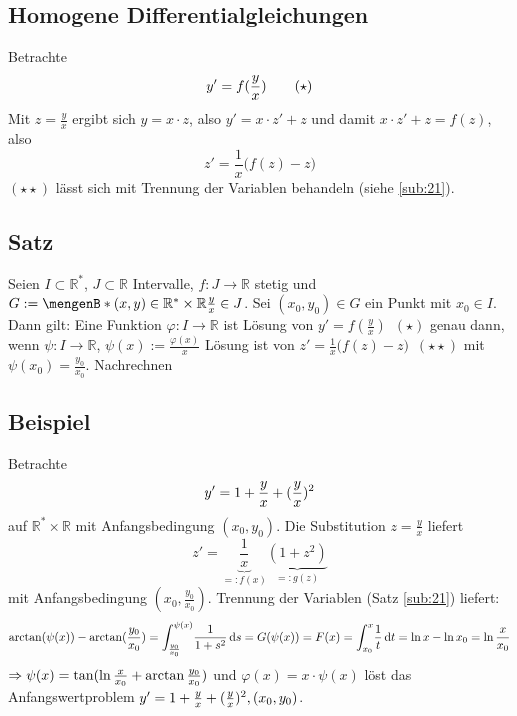 \subsection{Homogene Differentialgleichungen} %
\label{sub:27}
Betrachte
\[
	y' = f (\frac{y}{x} ) \tag{$\star$}
\]
Mit $z= \frac{y}{x} $ ergibt sich $y= x \cdot z$, also $y' = x \cdot z' + z$ und damit $x \cdot z' +z = f(z)$, also
\[
	z'=  \frac{1}{x} \big(f(z)-z\big) \tag{$\star\star$}
\]
$(\star\star)$ lässt sich mit Trennung der Variablen behandeln (siehe \ref{sub:21}). 

\subsection[Satz: Lösung von homogenen Differentialgleichungen]{Satz} %
\label{sub:27.2}
Seien $I \subset \mathds{R}^*$, $J \subset \mathds{R}$ Intervalle, $f : J \to \mathds{R}$ stetig und 
$G := \set[(x,y) \in \mathds{R}^* \times \mathds{R}]{\frac{y}{x} \in J } $. Sei $(x_0,y_0) \in G$ ein Punkt mit $x_0 \in I$. Dann gilt: Eine Funktion 
$\varphi : I \to \mathds{R}$ ist Lösung von $y'= f(\frac{y}{x} ) \enspace(\star)$ genau dann, wenn $\psi : I  \to \mathds{R}$, $\psi(x) := \frac{\varphi(x)}{x} $ Lösung ist 
von $z'= \frac{1}{x} \big(f(z)-z\big) \enspace (\star\star)$ mit $\psi(x_0)= \frac{y_0}{x_0} $.
Nachrechnen \bewende

\subsection[Beispiel zur Lösung einer homogenen DGL]{Beispiel} %
\label{sub:28}
Betrachte 
\[
	y' = 1+ \frac{y}{x} + (\frac{y}{x} )^2 
\]
auf $\mathds{R}^* \times \mathds{R}$ mit Anfangsbedingung $(x_0,y_0)$. Die Substitution $z=\frac{y}{x} $ liefert 
\[
	z'= \underbrace{\frac{1}{x}}_{=:f(x)} \underbrace{(1+z^2)}_{=:g(z)} 
\]
mit Anfangsbedingung $(x_0, \frac{y_0}{x_0} )$. Trennung der Variablen (Satz \ref{sub:21}) liefert:
\begin{align*}
	\arctan (\psi(x)) - \arctan (\frac{y_0}{x_0} )  = \int_{\frac{y_0}{x_0} } ^{\psi(x)} \! \frac{1}{1+s^2}  \, \mathrm{d}s= G(\psi(x)) = F(x) = \int_{x_0} ^{x} \! \frac{1}{t}  \, \mathrm{d}t  = \ln x - \ln x_0 = \ln \frac{x}{x_0} 
\end{align*}
$\Rightarrow \psi(x) = \tan (\ln \frac{x}{x_0} + \arctan \frac{y_0}{x_0} ) $ und $\varphi(x)= x \cdot \psi(x)$ löst das Anfangswertproblem 
$y'= 1+ \frac{y}{x} + (\frac{y}{x} )^2, (x_0, y_0) $.


